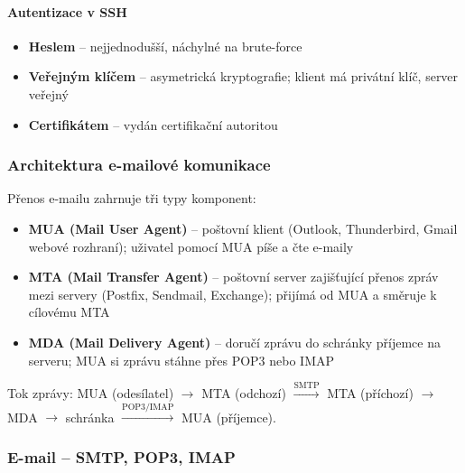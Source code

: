 \paragraph{Autentizace v SSH}
\begin{itemize}
  \item \textbf{Heslem} -- nejjednodušší, náchylné na brute-force
  \item \textbf{Veřejným klíčem} -- asymetrická kryptografie; klient má privátní klíč, server veřejný
  \item \textbf{Certifikátem} -- vydán certifikační autoritou
\end{itemize}

\subsubsection{Architektura e-mailové komunikace}

Přenos e-mailu zahrnuje tři typy komponent:

\begin{itemize}
  \item \textbf{MUA (Mail User Agent)} -- poštovní klient (Outlook, Thunderbird, Gmail webové rozhraní);
    uživatel pomocí MUA píše a čte e-maily
  \item \textbf{MTA (Mail Transfer Agent)} -- poštovní server zajišťující přenos zpráv mezi servery
    (Postfix, Sendmail, Exchange); přijímá od MUA a směruje k cílovému MTA
  \item \textbf{MDA (Mail Delivery Agent)} -- doručí zprávu do schránky příjemce na serveru;
    MUA si zprávu stáhne přes POP3 nebo IMAP
\end{itemize}

Tok zprávy: MUA (odesílatel) $\to$ MTA (odchozí) $\xrightarrow{\text{SMTP}}$ MTA (příchozí) $\to$ MDA $\to$ schránka $\xrightarrow{\text{POP3/IMAP}}$ MUA (příjemce).

\subsubsection{E-mail -- SMTP, POP3, IMAP}

